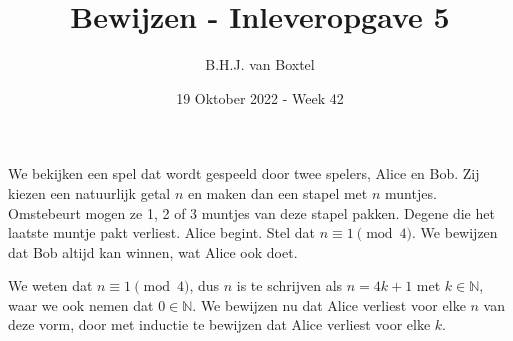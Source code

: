 \documentclass[12pt, dutch, a4paper]{article}
\theoremstyle{definition}
\begin{document}
\title{Bewijzen - Inleveropgave 5}
\author{B.H.J. van Boxtel}
\date{19 Oktober 2022 - Week 42} 

\maketitle
{} 

We bekijken een spel dat wordt gespeeld door twee spelers, Alice en Bob. 
Zij kiezen een natuurlijk getal $n$ en maken dan een stapel met $n$ muntjes. 
Omstebeurt mogen ze 1, 2 of 3 muntjes van deze stapel pakken. 
Degene die het laatste muntje pakt verliest. Alice begint. 
Stel dat $n \equiv 1 \pmod{4}$. We bewijzen dat Bob altijd kan winnen, wat Alice ook doet.

We weten dat $n \equiv 1 \pmod{4}$, 
dus $n$ is te schrijven als $n = 4k + 1$ met $k \in \mathbb{N}$, 
waar we ook nemen dat $0 \in \mathbb{N}$.  
We bewijzen nu dat Alice verliest voor elke $n$ van deze vorm,
door met inductie te bewijzen dat Alice verliest voor elke $k$.  
\end{document}
